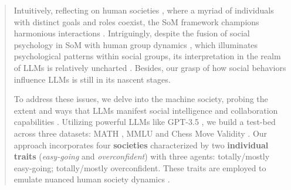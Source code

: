 \documentclass[11pt]{article}
\begin{document}
\begin{abstract}
Intuitively, reflecting on human societies \citep{J2002_TheoryOfMind,J2004_TheoryOfMind,EMNLP2022_TheoryOfMind,EACL2024_TheoryOfMind}, where a myriad of individuals with distinct goals and roles coexist, the SoM framework champions harmonious interactions \citep{J2003_SoM}. 
Intriguingly, despite the fusion of social psychology \citep{1982_SocialPsychology,2004_SocialPsychology,J2009_SocialPsychology} in SoM with human group dynamics \citep{Science2010_HumanDynamics,J1987_GroupDynamics}, which illuminates psychological patterns within social groups, its interpretation in the realm of LLMs is relatively uncharted \citep{arXiv2024_Survey-LLM-Psychology-Applications}. Besides, our grasp of how social behaviors influence LLMs is still in its nascent stages. 

To address these issues, we delve into the machine society, probing the extent and ways that LLMs manifest social intelligence and collaboration capabilities \citep{PNAS2024_TuringTest_Chatbots-Humans}. 
Utilizing powerful LLMs like GPT-3.5 \citep{ChatGPT-OpenAI}, we build a test-bed across three datasets: MATH \citep{NeurIPS2021_Dataset-MATH}, MMLU \citep{ICLR2021_Dataset-MMLU} and Chess Move Validity \citep{arXiv2022_Dataset-ChessMoveValidity}. 
Our approach incorporates four \textbf{societies} characterized by two \textbf{individual traits} (\textit{easy-going} and \textit{overconfident}) with three agents: totally/mostly easy-going; totally/mostly overconfident. 
These traits are employed to emulate nuanced human society dynamics \citep{arXiv2024_Human-Centered-LM,arXiv2024_AI-Human-Creative,arXiv2024_BehavioralSimulation,arXiv2023_MetaAgents,arXiv2023_LLM-Simulator}. 


\end{abstract}
\end{document}
